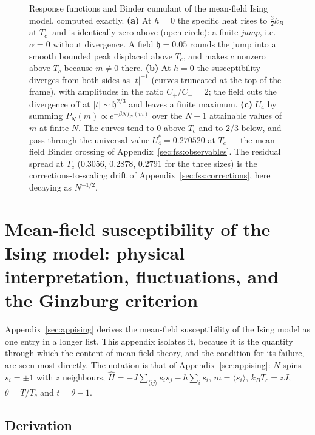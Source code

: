 \documentclass[10pt,a4paper]{article}
\theoremstyle{remark}
\begin{document}
\begin{figure}[htbp]
\begin{tikzpicture}[>=Stealth,font=\small,x=8.80cm,y=3.30cm]
\end{tikzpicture}
\caption{Response functions and Binder cumulant of the mean-field Ising model,
computed exactly. \textbf{(a)} At $h=0$ the specific heat rises to
$\tfrac32k_B$ at $T_c^{-}$ and is identically zero above (open circle): a finite
\emph{jump}, i.e.\ $\alpha=0$ without divergence. A field $\mathfrak{h}=0.05$
rounds the jump into a smooth bounded peak displaced above $T_c$, and makes $c$
nonzero above $T_c$ because $m\neq0$ there. \textbf{(b)} At $h=0$ the
susceptibility diverges from both sides as $|t|^{-1}$ (curves truncated at the top
of the frame), with amplitudes in the ratio $C_+/C_-=2$; the field cuts the
divergence off at $|t|\sim\mathfrak{h}^{2/3}$ and leaves a finite maximum.
\textbf{(c)} $U_4$ by summing $P_N(m)\propto e^{-\beta Nf_N(m)}$ over the $N+1$
attainable values of $m$ at finite $N$. The curves tend to
$0$ above $T_c$ and to $2/3$ below, and pass through the universal value
$U_4^{\ast}=0.270520$ at $T_c$ --- the mean-field Binder crossing of
Appendix~\ref{sec:fss:observables}. The residual spread at $T_c$ ($0.3056$,
$0.2878$, $0.2791$ for the three sizes) is the corrections-to-scaling drift of
Appendix~\ref{sec:fss:corrections}, here decaying as $N^{-1/2}$.}
\label{fig:appising2}
\end{figure}



\section{Mean-field susceptibility of the Ising model: physical interpretation, fluctuations, and the Ginzburg criterion}
\label{app:mfchi}

Appendix~\ref{sec:appising} derives the mean-field susceptibility of the Ising
model as one entry in a longer list. This appendix isolates it, because it is
the quantity through which the content of mean-field theory, and the condition
for its failure, are seen most directly. The notation is that of
Appendix~\ref{sec:appising}: $N$ spins $s_i=\pm1$ with $z$ neighbours,
$\hat H=-J\sum_{\langle ij\rangle}s_is_j-h\sum_is_i$, $m=\langle s_i\rangle$,
$k_BT_c=zJ$, $\theta=T/T_c$ and $t=\theta-1$.

\subsection{Derivation}
\label{sec:mfchi:derivation}
\end{document}
